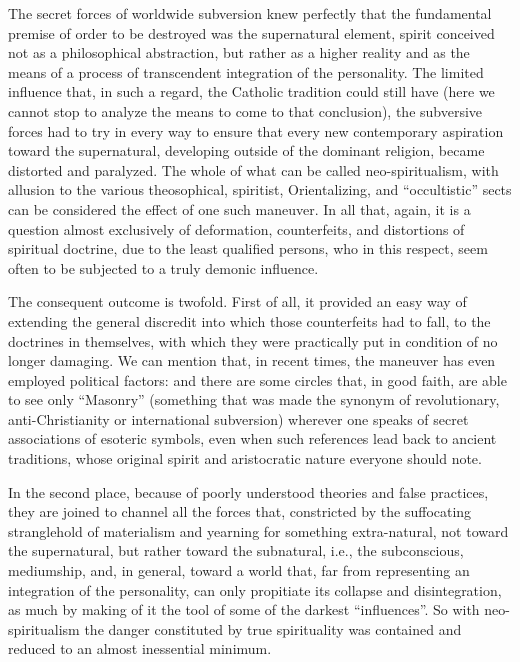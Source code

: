 The secret forces of worldwide subversion knew perfectly that the fundamental premise of order to be destroyed was the supernatural element, spirit conceived not as a philosophical abstraction, but rather as a higher reality and as the means of a process of transcendent integration of the personality. The limited influence that, in such a regard, the Catholic tradition could still have (here we cannot stop to analyze the means to come to that conclusion), the subversive forces had to try in every way to ensure that every new contemporary aspiration toward the supernatural, developing outside of the dominant religion, became distorted and paralyzed. The whole of what can be called neo-spiritualism, with allusion to the various theosophical, spiritist, Orientalizing, and ``occultistic'' sects can be considered the effect of one such maneuver. In all that, again, it is a question almost exclusively of deformation, counterfeits, and distortions of spiritual doctrine, due to the least qualified persons, who in this respect, seem often to be subjected to a truly demonic influence.

The consequent outcome is twofold. First of all, it provided an easy way of extending the general discredit into which those counterfeits had to fall, to the doctrines in themselves, with which they were practically put in condition of no longer damaging. We can mention that, in recent times, the maneuver has even employed political factors: and there are some circles that, in good faith, are able to see only ``Masonry'' (something that was made the synonym of revolutionary, anti-Christianity or international subversion) wherever one speaks of secret associations of esoteric symbols, even when such references lead back to ancient traditions, whose original spirit and aristocratic nature everyone should note.

In the second place, because of poorly understood theories and false practices, they are joined to channel all the forces that, constricted by the suffocating stranglehold of materialism and yearning for something extra-natural, not toward the supernatural, but rather toward the subnatural, i.e., the subconscious, mediumship, and, in general, toward a world that, far from representing an integration of the personality, can only propitiate its collapse and disintegration, as much by making of it the tool of some of the darkest ``influences''. So with neo-spiritualism the danger constituted by true spirituality was contained and reduced to an almost inessential minimum.

